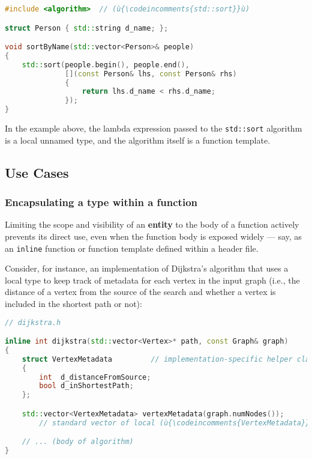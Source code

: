 \begin{lstlisting}[language=C++]
#include <algorithm>  // (ù{\codeincomments{std::sort}}ù)

struct Person { std::string d_name; };

void sortByName(std::vector<Person>& people)
{
    std::sort(people.begin(), people.end(),
              [](const Person& lhs, const Person& rhs)
              {
                  return lhs.d_name < rhs.d_name;
              });
}
\end{lstlisting}

\noindent In the example above, the lambda expression passed to the
\texttt{std::sort} algorithm is a local unnamed type, and the algorithm
itself is a function template.

\subsection[Use Cases]{Use Cases}\label{use-cases}

\subsubsection[Encapsulating a type within a function]{Encapsulating a type within a function}\label{encapsulating-a-type-within-a-function}

Limiting the scope and visibility of an \textbf{entity} to the body of a
function actively prevents its direct use, even when the function body
is exposed widely --- say, as an \texttt{inline} function or function
template defined within a header file.

Consider, for instance, an implementation of Dijkstra's algorithm that
uses a local type to keep track of metadata for each vertex in the input
graph (i.e., the distance of a vertex from the source of the search and
whether a vertex is included in the shortest path or not):

\begin{lstlisting}[language=C++]
// dijkstra.h

inline int dijkstra(std::vector<Vertex>* path, const Graph& graph)
{
    struct VertexMetadata         // implementation-specific helper class
    {
        int  d_distanceFromSource;
        bool d_inShortestPath;
    };

    std::vector<VertexMetadata> vertexMetadata(graph.numNodes());
        // standard vector of local (ù{\codeincomments{VertexMetadata}}ù) objects -- one per vertex

    // ... (body of algorithm)
}
\end{lstlisting}


